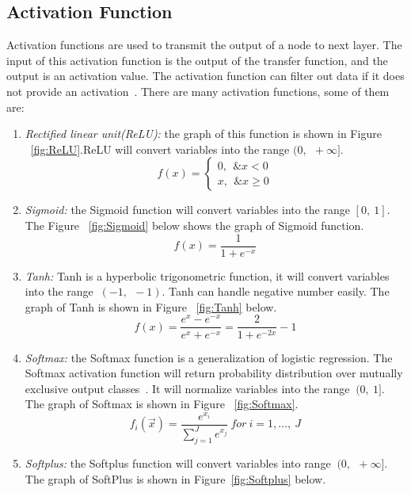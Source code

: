 \documentclass[]{UCD_CS_FYP_Report}
\begin{document}
\subsection{Activation Function}
Activation functions are used to transmit the output of a node to next layer. The input of this activation function is the output of the transfer function, and the output is an activation value. The activation function can filter out data if it does not provide an activation~\cite{Gibson:2017}. There are many activation functions, some of them are:
\begin{enumerate}
%
\item {\sl Rectified linear unit(ReLU):} the graph of this function is shown in Figure ~\ref{fig:ReLU}.ReLU will convert variables into the range $(0,\ \ +\infty{}]$.
\begin{equation}
\label{math:ReLU}
f\left(x\right)=\left\{\begin{array}{l}0,\ \ \&x<0 \\
x,\ \ \&x\geq{}0\end{array}\right.
\end{equation}
%
\item {\sl Sigmoid:} the Sigmoid function will convert variables into the range $[0,\ 1]$. The Figure ~\ref{fig:Sigmoid} below shows the graph of Sigmoid function.
\begin{equation}
\label{math:Sigmoid}
f\left(x\right)=\frac{1}{1+e^{-x}}
\end{equation}
%
\item {\sl Tanh:} Tanh is a hyperbolic trigonometric function, it will convert variables into the range $\ (-1,\ \ -1)$. Tanh can handle negative number easily. The graph of Tanh is shown in Figure ~\ref{fig:Tanh} below.
\begin{equation}
\label{math:Tanh}
f\left(x\right)=\frac{e^x-e^{-x}}{e^x+e^{-x}}=\frac{2}{1+e^{-2x}}-1
\end{equation}
%
\item {\sl Softmax:} the Softmax function is a generalization of logistic regression. The Softmax activation function will return probability distribution over mutually exclusive output classes~\cite{Gibson:2017}. It will normalize variables into the range $\ (0,\ 1]$. The graph of Softmax is shown in Figure ~\ref{fig:Softmax}.
\begin{equation}
\label{math:Softmax}
f_i\left(\vec{x}\right)=\frac{e^{x_i}}{\sum_{j=1}^Je^{x_j}}\ for\ i=1,…,\ J
\end{equation}
%
\item {\sl Softplus:} the Softplus function will convert variables into range $\ (0,\ \ +\infty{}]$. The graph of SoftPlus is shown in Figure~\ref{fig:Softplus} below.

\end{enumerate}
\end{document}

